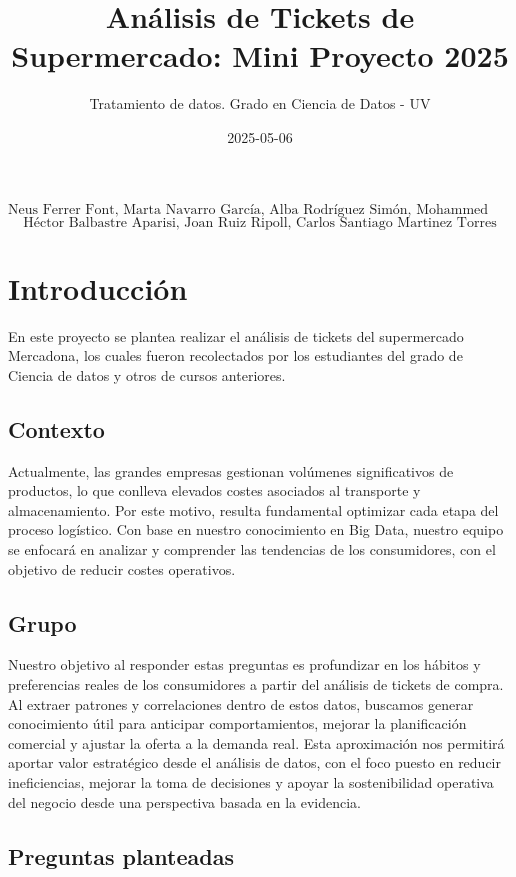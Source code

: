 \documentclass[
]{article}
\title{Análisis de Tickets de Supermercado: Mini Proyecto 2025}
\subtitle{Tratamiento de datos. Grado en Ciencia de Datos - UV}
\author{}
\date{\vspace{-2.5em}2025-05-06}
\begin{document}
\maketitle

\[\text{Neus Ferrer Font, Marta Navarro García, Alba Rodríguez Simón, Mohammed Aissa Djellouli}\]
\[\text{Héctor Balbastre Aparisi, Joan Ruiz Ripoll, Carlos Santiago Martinez Torres}\]

\section{Introducción}\label{introducciuxf3n}

En este proyecto se plantea realizar el análisis de tickets del supermercado Mercadona, los cuales fueron recolectados por los estudiantes del grado de Ciencia de datos y otros de cursos anteriores.

\subsection{Contexto}\label{contexto}

Actualmente, las grandes empresas gestionan volúmenes significativos de productos, lo que conlleva elevados costes asociados al transporte y almacenamiento. Por este motivo, resulta fundamental optimizar cada etapa del proceso logístico. Con base en nuestro conocimiento en Big Data, nuestro equipo se enfocará en analizar y comprender las tendencias de los consumidores, con el objetivo de reducir costes operativos.

\subsection{Grupo}\label{grupo}

Nuestro objetivo al responder estas preguntas es profundizar en los hábitos y preferencias reales de los consumidores a partir del análisis de tickets de compra. Al extraer patrones y correlaciones dentro de estos datos, buscamos generar conocimiento útil para anticipar comportamientos, mejorar la planificación comercial y ajustar la oferta a la demanda real. Esta aproximación nos permitirá aportar valor estratégico desde el análisis de datos, con el foco puesto en reducir ineficiencias, mejorar la toma de decisiones y apoyar la sostenibilidad operativa del negocio desde una perspectiva basada en la evidencia.

\subsection{Preguntas planteadas}\label{preguntas-planteadas}
\end{document}
